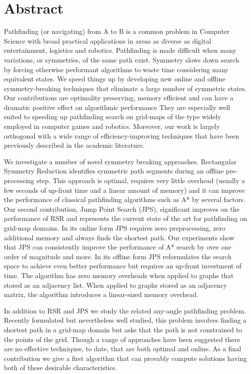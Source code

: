 \chapter*{Abstract}
\vspace{-1em}
Pathfinding (or navigating) from A to B is a common problem in Computer
Science with broad practical applications in areas as diverse as digital
entertainment, logistics and robotics.  Pathfinding is made difficult when
many variations, or symmetries, of the same path exist.  Symmetry slows down
search by forcing otherwise performant algorithms to waste time considering
many equivalent states.  We speed things up by developing new online and
offline symmetry-breaking techniques that eliminate a large number of
symmetric states.  Our contributions are optimality preserving, memory
efficient and can have a dramatic positive effect on algorithmic performance 
They are especially well suited to speeding up pathfinding search on grid-maps 
of the type widely employed in computer games and robotics.
Moreover, our work is largely orthogonal with a wide range of
efficiency-improving techniques that have been previously described in the
academic literature.
\par 
We investigate a number of novel symmetry breaking approaches.
Rectangular Symmetry Reduction identifies symmetric path segments during an 
offline pre-processing step.
This approach is optimal, requires very little overhead (usually a few seconds of
up-front time and a linear amount of memory) and it can improve
the performance of classical pathfinding algorithms such as A* by several factors.
Our second contribution, Jump Point
Search (JPS), significant improves on the performance of RSR and
represents the current state of the art for pathfinding on grid-map domains.
In its online form JPS requires zero preprocessing, zero additional memory and
always finds the shortest path. Our experiments show that JPS can consistently
improve the performance of A* search by over one order of magnitude and more.
In its offline form JPS reformulates the search space to achieve even better
performance but requires an up-front investment of time. The algorithm has
zero memory overheads when applied to graphs that stored as an adjacency list.
When applied to graphs stored as an adjacency matrix, the algorithm introduces
a linear-sized memory overhead. 
\par
In addition to RSR and JPS we study the related any-angle pathfinding problem.
Recently formulated but nevertheless well studied, this problem involves finding 
a shortest path in a grid-map domain but asks that the path
is not constrained to the points of the grid.  Though a range of approaches have
been suggested there are no effective techniques, to date, that are both optimal
and online.
As a final contribution we give a first algorithm that can provably compute 
solutions having both of these desirable characteristics.
